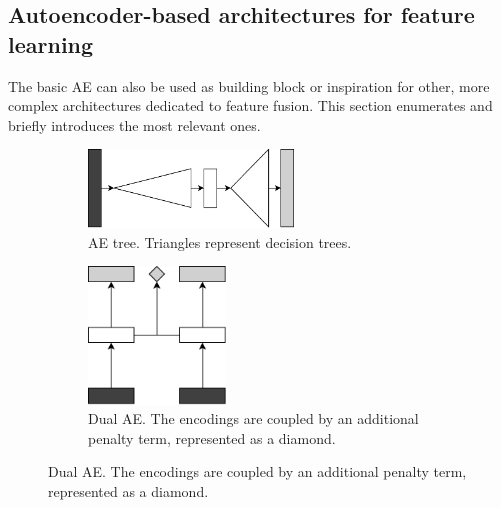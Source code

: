 \documentclass[preprint,5p,compress]{elsarticle}
\begin{document}
\subsection{Autoencoder-based architectures for feature learning} \label{Sec.AEbased}

The basic AE can also be used as building block or inspiration for other, more complex architectures dedicated to feature fusion. This section enumerates and briefly introduces the most relevant ones.

\begin{figure}[ht!]
  \centering
  \begin{subfigure}[t]{\columnwidth}
    \centering
    \includegraphics[width=0.6\textwidth]{ArchTreeAE.pdf}
    \caption{\label{Fig.AETree}AE tree. Triangles represent decision trees.}
  \end{subfigure}

  \vspace{.5em}
  
  \begin{subfigure}[t]{\columnwidth}
    \centering
    \includegraphics[width=0.4\textwidth]{ArchDualAE.pdf}
    \caption{\label{Fig.DualAE}Dual AE. The encodings are coupled by an additional penalty term, represented as a diamond.}
  \end{subfigure}

  \vspace{.5em}
  

\end{figure}
\end{document}
